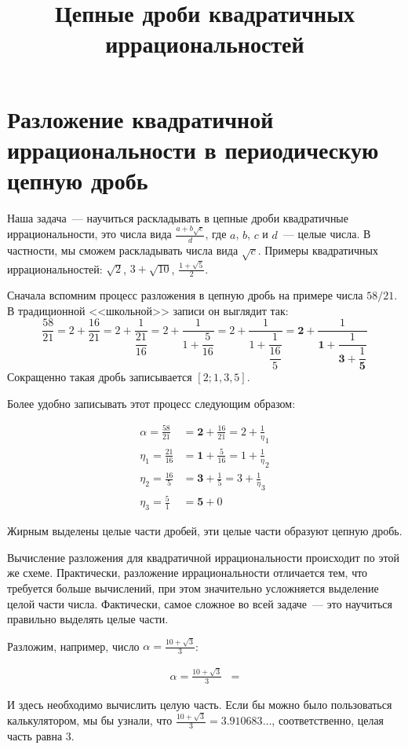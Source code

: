 \documentclass{article}
\title{Цепные дроби квадратичных иррациональностей}
\author{}
\date{}
\begin{document}
\maketitle

\section{Разложение квадратичной иррациональности в периодическую цепную дробь}
Наша задача~--- научиться раскладывать в цепные дроби квадратичные иррациональности, это числа вида $\frac{a + b\sqrt{c}}{d}$, где $a$, $b$, $c$ и $d$~--- целые числа. В частности, мы сможем раскладывать числа вида $\sqrt c$. Примеры квадратичных иррациональностей: $\sqrt{2}$, $3 + \sqrt{10}$, $\frac{1 + \sqrt5}2$.

Сначала вспомним процесс разложения в цепную дробь на примере числа $58/21$. В традиционной <<школьной>> записи он выглядит так:
$$\dfrac{58}{21}=
2 + \dfrac{16}{21}=
2 + \dfrac1{\dfrac{21}{16}}=
2 + \dfrac1{1 + \dfrac{5}{16}}=
2 + \dfrac1{1 + \dfrac{1}{\dfrac{16}{5}}}=
\mathbf2 + \dfrac1{\mathbf1 + \dfrac{1}{\mathbf3 + \dfrac{1}{\mathbf5}}}$$
Сокращенно такая дробь записывается $[2;1,3,5]$.

Более удобно записывать этот процесс следующим образом:

\begin{align*}
\alpha=\frac{58}{21}&=\mathbf{2}+\frac{16}{21}=2+\frac1\eta_1\\
\eta_1=\frac{21}{16}&=\mathbf{1}+\frac5{16}=1+\frac1\eta_2\\
\eta_2=\frac{16}5&=\mathbf{3}+\frac15=3+\frac1\eta_3\\
\eta_3=\frac51&=\mathbf{5}+0
\end{align*}

Жирным выделены целые части дробей, эти целые части образуют цепную дробь.

Вычисление разложения для квадратичной иррациональности происходит по этой же схеме. Практически, разложение иррациональности отличается тем, что требуется больше вычислений, при этом значительно усложняется выделение целой части числа. Фактически, самое сложное во всей задаче~--- это научиться правильно выделять целые части.

Разложим, например, число $\alpha=\frac{10+\sqrt3}{3}$:

\begin{align*}
\alpha=\frac{10+\sqrt3}{3}&=
\end{align*}

\noindent И здесь необходимо вычислить целую часть. Если бы можно было пользоваться калькулятором, мы бы узнали, что $\frac{10+\sqrt3}{3}=3.910683\ldots$, соответственно, целая часть равна 3.
\end{document}
